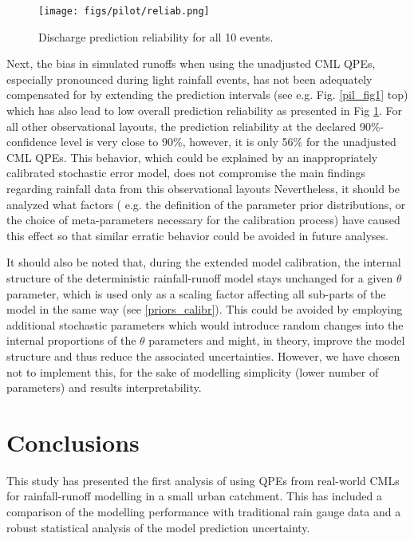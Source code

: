 \documentclass{ctuthesis}\usepackage[]{graphicx}\usepackage[]{color}
\begin{document}
\begin{figure}[H]
\begin{center}
\texttt{[image: figs/pilot/reliab.png]}
\caption{Discharge prediction reliability for all 10 events.} \label{pil_fig4}
\end{center}
\end{figure}

Next, the bias in simulated runoffs when using the unadjusted CML QPEs, especially pronounced during light rainfall events, has not been adequately compensated for by extending the prediction intervals (see e.g. Fig. \ref{pil_fig1} top) which has also lead to low overall prediction reliability as presented in Fig \ref{pil_fig4}. For all other observational layouts, the prediction reliability at the declared 90\%-confidence level is very close to 90\%, however, it is only 56\% for the unadjusted CML QPEs. This behavior, which could be explained by an inappropriately calibrated stochastic error model, does not compromise the main findings regarding rainfall data from this observational layouts Nevertheless, it should be analyzed what factors ( e.g. the definition of the parameter prior distributions, or the choice of meta-parameters necessary for the calibration process) have caused this effect so that similar erratic behavior could be avoided in future analyses.  

It should also be noted that, during the extended model calibration, the internal structure of the deterministic rainfall-runoff model stays unchanged for a given $\theta$ parameter, which is used only as a scaling factor affecting all sub-parts of the model in the same way (see \ref{priors_calibr}). This could be avoided by employing additional stochastic parameters which would introduce random changes into the internal proportions of the $\theta$ parameters and might, in theory, improve the model structure and thus reduce the associated uncertainties. However, we have chosen not to implement this, for the sake of modelling simplicity (lower number of parameters) and results interpretability.


\section{Conclusions}

This study has presented the first analysis of using QPEs from real-world CMLs for rainfall-runoff modelling in a small urban catchment. This has included a comparison of the modelling performance with traditional rain gauge data and a robust statistical analysis of the model prediction uncertainty.
\end{document}
